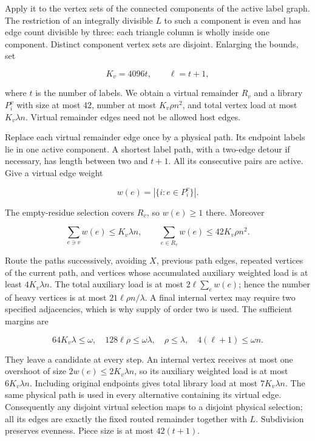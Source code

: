 \documentclass[english,11pt,a4paper]{article}
\begin{document}
Apply it to the vertex sets of the connected components of the active label graph. The restriction of an integrally divisible \(L\) to such a component is even and has edge count divisible by three: each triangle column is wholly inside one component. Distinct component vertex sets are disjoint. Enlarging the bounds, set

\[K_v=4096t,\qquad \ell=t+1,\]

where \(t\) is the number of labels. We obtain a virtual remainder \(R_v\) and a library \(P_i^v\) with size at most 42, number at most \(K_v\rho n^2\), and total vertex load at most \(K_v\lambda n\). Virtual remainder edges need not be allowed host edges.

Replace each virtual remainder edge once by a physical path. Its endpoint labels lie in one active component. A shortest label path, with a two-edge detour if necessary, has length between two and \(t+1\). All its consecutive pairs are active. Give a virtual edge weight

\[w(e)=|\{i:e\in P_i^v\}|.
\tag{B.3.3}\]

The empty-residue selection covers \(R_v\), so \(w(e)\ge1\) there. Moreover

\[\sum_{e\ni v}w(e)\le K_v\lambda n,
\qquad \sum_{e\in R_v}w(e)\le42K_v\rho n^2.
\tag{B.3.4}\]

Route the paths successively, avoiding \(X\), previous path edges, repeated vertices of the current path, and vertices whose accumulated auxiliary weighted load is at least \(4K_v\lambda n\). The total auxiliary load is at most \(2\ell\sum_e w(e)\); hence the number of heavy vertices is at most \(21\ell\rho n/\lambda\). A final internal vertex may require two specified adjacencies, which is why supply of order two is used. The sufficient margins are

\[64K_v\lambda\le\omega,\quad
128\ell\rho\le\omega\lambda,\quad
\rho\le\lambda,\quad4(\ell+1)\le\omega n.
\tag{B.3.5}\]

They leave a candidate at every step. An internal vertex receives at most one overshoot of size \(2w(e)\le2K_v\lambda n\), so its auxiliary weighted load is at most \(6K_v\lambda n\). Including original endpoints gives total library load at most \(7K_v\lambda n\). The same physical path is used in every alternative containing its virtual edge. Consequently any disjoint virtual selection maps to a disjoint physical selection; all its edges are exactly the fixed routed remainder together with \(L\). Subdivision preserves evenness. Piece size is at most \(42(t+1)\).
\end{document}
